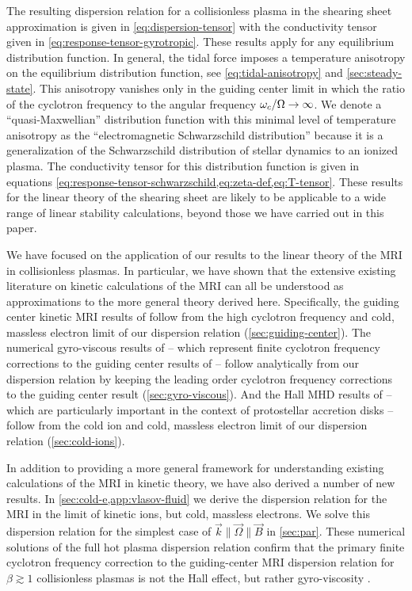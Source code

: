 \documentclass[aps,pre,notitlepage,amsmath,amssymb,amsfonts,nobibnotes,nofootinbib]{revtex4-1}
\begin{document}
The resulting dispersion relation for a collisionless plasma in the shearing
sheet approximation is given in \cref{eq:dispersion-tensor} with the
conductivity tensor given in \cref{eq:response-tensor-gyrotropic}. These
results apply for any equilibrium distribution function. In general, the tidal
force imposes a temperature anisotropy on the equilibrium distribution
function, see \cref{eq:tidal-anisotropy} and \cref{sec:steady-state}. This
anisotropy vanishes only in the guiding center limit in which the ratio of the
cyclotron frequency to the angular frequency $\omega_c/\Omega\rightarrow\infty$.
We denote a ``quasi-Maxwellian'' distribution function with this minimal level
of temperature anisotropy as the ``electromagnetic Schwarzschild
distribution'' because it is a generalization of the Schwarzschild
distribution of stellar dynamics to an ionized plasma. The conductivity tensor
for this distribution function is given in equations
\cref{eq:response-tensor-schwarzschild,eq:zeta-def,eq:T-tensor}. These results
for the linear theory of the shearing sheet are likely to be applicable to a
wide range of linear stability calculations, beyond those we have carried out
in this paper. 

We have focused on the application of our results to the linear theory of the
MRI in collisionless plasmas. In particular, we have shown that the extensive
existing literature on kinetic calculations of the MRI can all be understood
as approximations to the more general theory derived here. Specifically, the
guiding center kinetic MRI results of \citet{Quataert2002} follow from the
high cyclotron frequency and cold, massless electron limit of our dispersion
relation (\cref{sec:guiding-center}). The numerical gyro-viscous results of
\citet{Ferraro2007} -- which represent finite cyclotron frequency corrections
to the guiding center results of \citet{Quataert2002} -- follow analytically
from our dispersion relation by keeping the leading order cyclotron frequency
corrections to the guiding center result (\cref{sec:gyro-viscous}). And the
Hall MHD results of \citet{Wardle1999} -- which are particularly important in
the context of protostellar accretion disks -- follow from the cold ion and
cold, massless electron limit of our dispersion relation
(\cref{sec:cold-ions}).

In addition to providing a more general framework for understanding existing
calculations of the MRI in kinetic theory, we have also derived a number of
new results. In \cref{sec:cold-e,app:vlasov-fluid} we derive the dispersion
relation for the MRI in the limit of kinetic ions, but cold, massless
electrons. We solve this dispersion relation for the simplest case of
$\vec{k}\parallel\vec{\Omega}\parallel\vec{B}$ in \cref{sec:par}. These
numerical solutions of the full hot plasma dispersion relation confirm that
the primary finite cyclotron frequency correction to the guiding-center MRI
dispersion relation for $\beta\gtrsim1$ collisionless plasmas is not the Hall
effect, but rather gyro-viscosity \citep{Ferraro2007}.
\end{document}
